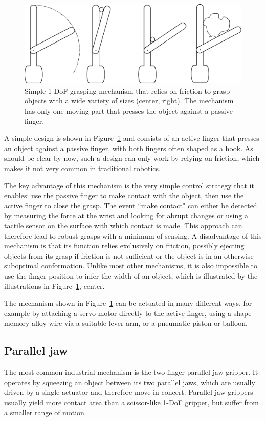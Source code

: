 \begin{figure}
\includegraphics[width=\columnwidth]{figs/gripper-1-dof}
\caption{Simple 1-DoF grasping mechanism that relies on friction to grasp objects with a wide variety of sizes (center, right). The mechanism has only one moving part that presses the object against a passive finger. \label{fig:gripper-1-dof}}
\end{figure}

A simple design is shown in Figure~\ref{fig:gripper-1-dof} and consists of an active finger that presses an object against a passive finger, with both fingers often shaped as a hook. As should be clear by now, such a design can only work by relying on friction, which makes it not very common in traditional robotics. 

The key advantage of this mechanism is the very simple control strategy that it enables: use the passive finger to make contact with the object, then use the active finger to close the grasp. The event ``make contact" can either be detected by measuring the force at the wrist and looking for abrupt changes or using a tactile sensor on the surface with which contact is made. This approach can therefore lead to robust grasps with a minimum of sensing. A disadvantage of this mechanism is that its function relies exclusively on friction, possibly ejecting objects from its grasp if friction is not sufficient or the object is in an otherwise suboptimal conformation. Unlike most other mechanisms, it is also impossible to use the finger position to infer the width of an object, which is illustrated by the illustrations in Figure~\ref{fig:gripper-1-dof}, center. 

The mechanism shown in Figure~\ref{fig:gripper-1-dof} can be actuated in many different ways, for example by attaching a servo motor directly to the active finger, using a shape-memory alloy wire via a suitable lever arm, or a pneumatic piston or balloon.

\subsection{Parallel jaw}
The most common industrial mechanism is the two-finger parallel jaw gripper. It operates by squeezing an object between its two parallel jaws, which are usually driven by a single actuator and therefore move in concert. Parallel jaw grippers usually yield more contact area than a scissor-like 1-DoF gripper, but suffer from a smaller range of motion. 


